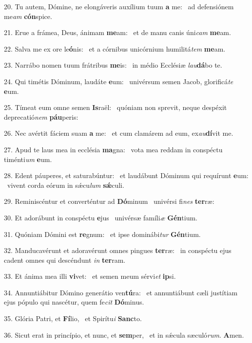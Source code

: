 20. Tu autem, Dómine, ne elongáveris auxílium tuum \textbf{a} me: \ast\  ad defensiónem me\textit{am} \textbf{cón}spice.\

21. Erue a frámea, Deus, ánimam \textbf{me}am: \ast\  et de manu canis úni\textit{cam} \textbf{me}am.\

22. Salva me ex ore le\textbf{ó}nis: \ast\  et a córnibus unicórnium humilitá\textit{tem} \textbf{me}am.\

23. Narrábo nomen tuum frátribus \textbf{me}is: \ast\  in médio Ecclésiæ \textit{lau}\textbf{dá}bo te.\

24. Qui timétis Dóminum, laudáte \textbf{e}um: \ast\  univérsum semen Jacob, glorificá\textit{te} \textbf{e}um.\

25. Tímeat eum omne semen \textbf{Is}raël: \ast\  quóniam non sprevit, neque despéxit deprecatió\textit{nem} \textbf{páu}peris:\

26. Nec avértit fáciem suam \textbf{a} me: \ast\  et cum clamárem ad eum, ex\textit{au}\textbf{dí}vit me.\

27. Apud te laus mea in ecclésia \textbf{ma}gna: \ast\  vota mea reddam in conspéctu timénti\textit{um} \textbf{e}um.\

28. Edent páuperes, et saturabúntur: \dag\  et laudábunt Dóminum qui requírunt \textbf{e}um: \ast\  vivent corda eórum in sǽcu\textit{lum} \textbf{sǽ}culi.\

29. Reminiscéntur et converténtur ad \textbf{Dó}minum \ast\  univérsi fi\textit{nes} \textbf{ter}ræ:\

30. Et adorábunt in conspéctu \textbf{e}jus \ast\  univérsæ famíli\textit{æ} \textbf{Gén}tium.\

31. Quóniam Dómini est \textbf{re}gnum: \ast\  et ipse dominábi\textit{tur} \textbf{Gén}tium.\

32. Manducavérunt et adoravérunt omnes pingues \textbf{ter}ræ: \ast\  in conspéctu ejus cadent omnes qui descéndunt \textit{in} \textbf{ter}ram.\

33. Et ánima mea illi \textbf{vi}vet: \ast\  et semen meum sérvi\textit{et} \textbf{ip}si.\

34. Annuntiábitur Dómino generátio ven\textbf{tú}ra: \ast\  et annuntiábunt cæli justítiam ejus pópulo qui nascétur, quem fe\textit{cit} \textbf{Dó}minus.\

35. Glória Patri, et \textbf{Fí}lio, \ast\  et Spirítu\textit{i} \textbf{Sanc}to.\

36. Sicut erat in princípio, et nunc, et \textbf{sem}per, \ast\  et in sǽcula sæculó\textit{rum}. \textbf{A}men.\

